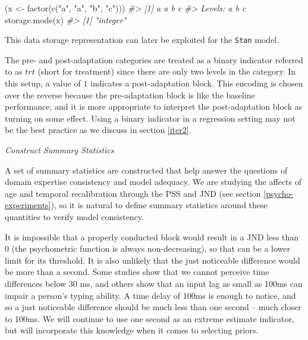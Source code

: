 \documentclass[11pt, oneside, openany]{scrbook}
\newenvironment{Shaded}{\begin{snugshade}}{\end{snugshade}}
\newcommand{\CommentTok}[1]{\textcolor[rgb]{0.56,0.35,0.01}{\textit{#1}}}
\newcommand{\FunctionTok}[1]{\textcolor[rgb]{0.00,0.00,0.00}{#1}}
\newcommand{\NormalTok}[1]{#1}
\newcommand{\OtherTok}[1]{\textcolor[rgb]{0.56,0.35,0.01}{#1}}
\newcommand{\StringTok}[1]{\textcolor[rgb]{0.31,0.60,0.02}{#1}}
\begin{document}

\begin{Shaded}
\begin{Highlighting}[]
\NormalTok{(x }\OtherTok{\textless{}{-}} \FunctionTok{factor}\NormalTok{(}\FunctionTok{c}\NormalTok{(}\StringTok{"a"}\NormalTok{, }\StringTok{"a"}\NormalTok{, }\StringTok{"b"}\NormalTok{, }\StringTok{"c"}\NormalTok{)))}
\CommentTok{\#\textgreater{} [1] a a b c}
\CommentTok{\#\textgreater{} Levels: a b c}
\FunctionTok{storage.mode}\NormalTok{(x)}
\CommentTok{\#\textgreater{} [1] "integer"}
\end{Highlighting}
\end{Shaded}


This data storage representation can later be exploited for the \texttt{Stan} model.

The pre- and post-adaptation categories are treated as a binary indicator referred to as \(trt\) (short for treatment) since there are only two levels in the category. In this setup, a value of \(1\) indicates a post-adaptation block. This encoding is chosen over the reverse because the pre-adaptation block is like the baseline performance, and it is more appropriate to interpret the post-adaptation block as turning on some effect. Using a binary indicator in a regression setting may not be the best practice as we discuss in section \ref{iter2}.

\emph{Construct Summary Statistics}

A set of summary statistics are constructed that help answer the questions of domain expertise consistency and model adequacy. We are studying the affects of age and temporal recalibration through the PSS and JND (see section \ref{psycho-experiments}), so it is natural to define summary statistics around these quantities to verify model consistency.

It is impossible that a properly conducted block would result in a JND less than 0 (the psychometric function is always non-decreasing), so that can be a lower limit for its threshold. It is also unlikely that the just noticeable difference would be more than a second. Some studies show that we cannot perceive time differences below 30 ms, and others show that an input lag as small as 100ms can impair a person's typing ability. A time delay of 100ms is enough to notice, and so a just noticeable difference should be much less than one second -- much closer to 100ms. We will continue to use one second as an extreme estimate indicator, but will incorporate this knowledge when it comes to selecting priors.
\end{document}
